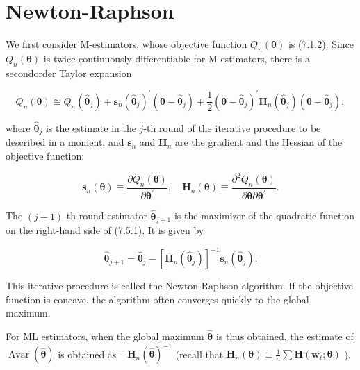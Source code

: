 \documentclass[10pt]{article}
\begin{document}
\section*{Newton-Raphson}
We first consider M-estimators, whose objective function $Q_{n}(\boldsymbol{\theta})$ is (7.1.2). Since $Q_{n}(\boldsymbol{\theta})$ is twice continuously differentiable for M-estimators, there is a secondorder Taylor expansion


\begin{equation*}
Q_{n}(\boldsymbol{\theta}) \cong Q_{n}\left(\hat{\boldsymbol{\theta}}_{j}\right)+\mathbf{s}_{n}\left(\hat{\boldsymbol{\theta}}_{j}\right)^{\prime}\left(\boldsymbol{\theta}-\hat{\boldsymbol{\theta}}_{j}\right)+\frac{1}{2}\left(\boldsymbol{\theta}-\hat{\boldsymbol{\theta}}_{j}\right)^{\prime} \mathbf{H}_{n}\left(\hat{\boldsymbol{\theta}}_{j}\right)\left(\boldsymbol{\theta}-\hat{\boldsymbol{\theta}}_{j}\right), \tag{7.5.1}
\end{equation*}


where $\hat{\boldsymbol{\theta}}_{j}$ is the estimate in the $j$-th round of the iterative procedure to be described in a moment, and $\mathbf{s}_{n}$ and $\mathbf{H}_{n}$ are the gradient and the Hessian of the objective function:


\begin{equation*}
\mathbf{s}_{n}(\boldsymbol{\theta}) \equiv \frac{\partial Q_{n}(\boldsymbol{\theta})}{\partial \boldsymbol{\theta}^{\prime}}, \quad \mathbf{H}_{n}(\boldsymbol{\theta}) \equiv \frac{\partial^{2} Q_{n}(\boldsymbol{\theta})}{\partial \boldsymbol{\theta} \partial \boldsymbol{\theta}^{\prime}} . \tag{7.5.2}
\end{equation*}


The $(j+1)$-th round estimator $\hat{\boldsymbol{\theta}}_{j+1}$ is the maximizer of the quadratic function on the right-hand side of (7.5.1). It is given by


\begin{equation*}
\hat{\boldsymbol{\theta}}_{j+1}=\hat{\boldsymbol{\theta}}_{j}-\left[\mathbf{H}_{n}\left(\hat{\boldsymbol{\theta}}_{j}\right)\right]^{-1} \mathbf{s}_{n}\left(\hat{\boldsymbol{\theta}}_{j}\right) . \tag{7.5.3}
\end{equation*}


This iterative procedure is called the Newton-Raphson algorithm. If the objective function is concave, the algorithm often converges quickly to the global maximum.

For ML estimators, when the global maximum $\hat{\boldsymbol{\theta}}$ is thus obtained, the estimate of $\operatorname{Avar}(\hat{\boldsymbol{\theta}})$ is obtained as $-\mathbf{H}_{n}(\hat{\boldsymbol{\theta}})^{-1}$ (recall that $\mathbf{H}_{n}(\boldsymbol{\theta}) \equiv \frac{1}{n} \sum \mathbf{H}\left(\mathbf{w}_{t} ; \boldsymbol{\theta}\right)$ ).
\end{document}
